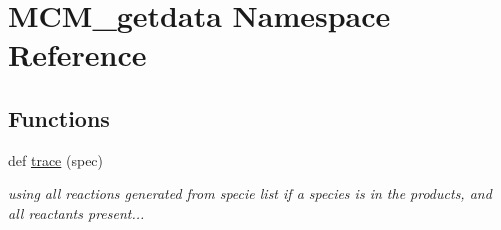 \hypertarget{namespaceMCM__getdata}{}\section{M\+C\+M\+\_\+getdata Namespace Reference}
\label{namespaceMCM__getdata}
\subsection*{Functions}
\begin{DoxyCompactItemize}
\item 
def \mbox{\hyperlink{namespaceMCM__getdata_af01612e4dc4d42140d736222480555fe}{trace}} (spec)
\begin{DoxyCompactList}\small\item\em using all reactions generated from specie list if a species is in the products, and all reactants present... \end{DoxyCompactList}\end{DoxyCompactItemize}
